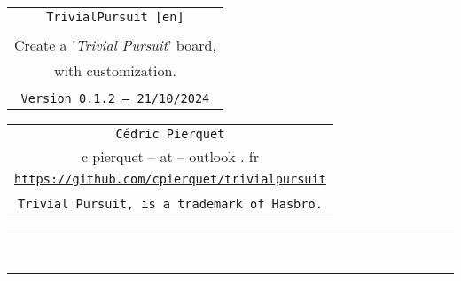 \documentclass[11pt,a4paper]{ltxdoc}
\def\TPversion{0.1.2}
\def\TPdate{21/10/2024}
\begin{document}
\pagestyle{fancy}

\thispagestyle{empty}

\begin{center}
	\begin{minipage}{0.88\linewidth}
	\begin{tcolorbox}[colframe=yellow,colback=yellow!15]
		\begin{center}
			\begin{tabular}{c}
				{\Huge \texttt{TrivialPursuit [en]}}\\
				\\
				{\LARGE Create a '\textit{Trivial Pursuit}' board,} \\
				{\LARGE with customization.} \\
				\\
				{\small \texttt{Version \TPversion{} -- \TPdate}}
		\end{tabular}
		\end{center}
	\end{tcolorbox}
\end{minipage}
\end{center}

\begin{center}
	\begin{tabular}{c}
	\texttt{Cédric Pierquet}\\
	{\ttfamily c pierquet -- at -- outlook . fr}\\
	\texttt{\url{https://github.com/cpierquet/trivialpursuit}} \\
	\\
	\texttt{Trivial Pursuit\texttrademark, is a trademark of Hasbro.}
\end{tabular}
\end{center}

\hrule

\vfill

\begin{tcolorbox}[colframe=lightgray,colback=lightgray!5]
\BoardTrivialPursuit
\end{tcolorbox}

\vfill~

\pagebreak


\hypertarget{matoc}{}

\tableofcontents

\vspace*{5mm}

\hrule

\vspace*{5mm}
\end{document}
